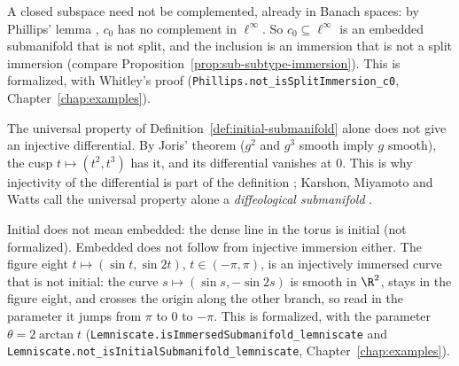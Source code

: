 \begin{remark}
  \label{rem:sub-immersion-vs-split}
  A closed subspace need not be complemented, already in Banach spaces: by Phillips' lemma
  \cite{Phi40}, $c_0$ has no complement in $\ell^\infty$. So $c_0 \subseteq \ell^\infty$ is an
  embedded submanifold that is not split, and the inclusion is an immersion that is not a split
  immersion (compare Proposition~\ref{prop:sub-subtype-immersion}). This is formalized, with
  Whitley's proof \cite{Whi66} (\texttt{Phillips.not\_isSplitImmersion\_c0},
  Chapter~\ref{chap:examples}).
\end{remark}

\begin{remark}
  \label{rem:sub-joris}
  The universal property of Definition~\ref{def:initial-submanifold} alone does not give an
  injective differential. By Joris' theorem \cite{Jor82} ($g^2$ and $g^3$ smooth imply $g$
  smooth), the cusp $t \mapsto (t^2, t^3)$ has it, and its differential vanishes at $0$. This is
  why injectivity of the differential is part of the definition \cite[p.~336]{GN26};
  Karshon, Miyamoto and Watts call the universal property alone a \emph{diffeological
  submanifold} \cite{KMW24}.
\end{remark}

\begin{remark}
  \label{rem:sub-initial-embedded}
  Initial does not mean embedded: the dense line in the torus is initial (not formalized).
  Embedded does not follow from injective immersion either. The figure eight
  $t \mapsto (\sin t, \sin 2t)$, $t \in (-\pi, \pi)$, is an injectively immersed curve that is
  not initial: the curve $s \mapsto (\sin s, -\sin 2s)$ is smooth in $\R^2$, stays in the figure
  eight, and crosses the origin along the other branch, so read in the parameter it jumps from
  $\pi$ to $0$ to $-\pi$. This is formalized, with the parameter $\theta = 2\arctan t$
  (\texttt{Lemniscate.isImmersedSubmanifold\_lemniscate} and
  \texttt{Lemniscate.not\_isInitialSubmanifold\_lemniscate}, Chapter~\ref{chap:examples}).
\end{remark}

